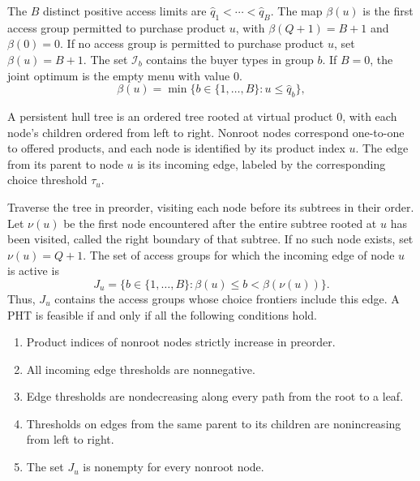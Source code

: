 The $B$ distinct positive access limits are $\widehat q_1<\cdots<\widehat q_B$. The map \(\beta(u)\) is the first access group permitted to purchase product \(u\), with \(\beta(Q+1)=B+1\) and \(\beta(0)=0\). If no access group is permitted to purchase product \(u\), set \(\beta(u)=B+1\). The set $\mathcal I_b$ contains the buyer types in group $b$. If $B=0$, the joint optimum is the empty menu with value 0.
\begin{equation}
\beta(u)=\min\{b\in\{1,\ldots,B\}:u\le\widehat q_b\},
\label{eq:s4_3}
\tag{7}
\end{equation}
\setcounter{section}{4}
\begin{definition}\label{def:pht_feasibility}
A persistent hull tree is an ordered tree rooted at virtual product 0, with each node's children ordered from left to right. Nonroot nodes correspond one-to-one to offered products, and each node is identified by its product index $u$. The edge from its parent to node $u$ is its incoming edge, labeled by the corresponding choice threshold $\tau_u$.

Traverse the tree in preorder, visiting each node before its subtrees in their order. Let $\nu(u)$ be the first node encountered after the entire subtree rooted at $u$ has been visited, called the right boundary of that subtree. If no such node exists, set $\nu(u)=Q+1$. The set of access groups for which the incoming edge of node $u$ is active is
\begin{equation}
J_u=\{b\in\{1,\ldots,B\}:\beta(u)\le b<\beta(\nu(u))\}.
\label{eq:s4_4}
\tag{8}
\end{equation} Thus, $J_u$ contains the access groups whose choice frontiers include this edge. A PHT is feasible if and only if all the following conditions hold.

\begin{enumerate}
\item Product indices of nonroot nodes strictly increase in preorder.
\item All incoming edge thresholds are nonnegative.
\item Edge thresholds are nondecreasing along every path from the root to a leaf.
\item Thresholds on edges from the same parent to its children are nonincreasing from left to right.
\item The set $J_u$ is nonempty for every nonroot node.
\end{enumerate}
\end{definition}
